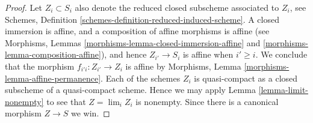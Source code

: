 \documentclass[10pt,a4paper]{amsart}
\theoremstyle{plain}
\theoremstyle{definition}
\theoremstyle{remark}
\numberwithin{equation}{subsection}
\def\lim{\mathop{\mathrm{lim}}\nolimits}
\begin{document}
\begin{proof}
Let $Z_i \subset S_i$ also denote the reduced closed subscheme
associated to $Z_i$, see Schemes,
Definition \ref{schemes-definition-reduced-induced-scheme}.
A closed immersion is affine, and a composition of affine
morphisms is affine (see
Morphisms, Lemmas \ref{morphisms-lemma-closed-immersion-affine}
and \ref{morphisms-lemma-composition-affine}), and hence $Z_{i'} \to S_i$ is
affine when $i' \geq i$. We conclude that the morphism
$f_{i'i} : Z_{i'} \to Z_i$ is affine by
Morphisms, Lemma \ref{morphisms-lemma-affine-permanence}.
Each of the schemes $Z_i$ is quasi-compact as a closed
subscheme of a quasi-compact scheme. Hence we may apply
Lemma \ref{lemma-limit-nonempty} to see that
$Z = \lim_i Z_i$ is nonempty. Since there is a
canonical morphism $Z \to S$ we win.
\end{proof}
\end{document}
